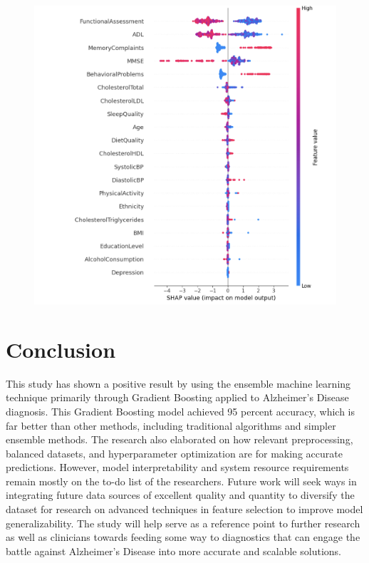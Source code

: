 \documentclass[conference]{IEEEtran} %
\begin{document}
\begin{figure}[ht]
    \centering
    \includegraphics[width=\linewidth]{Fig-10.png}
    \caption{}
    \label{fig:10}
\end{figure}
\FloatBarrier



\section{Conclusion}

This study has shown a positive result by using the ensemble machine learning technique primarily through Gradient Boosting applied to Alzheimer's Disease diagnosis. This Gradient Boosting model achieved 95 percent accuracy, which is far better than other methods, including traditional algorithms and simpler ensemble methods. The research also elaborated on how relevant preprocessing, balanced datasets, and hyperparameter optimization are for making accurate predictions. However, model interpretability and system resource requirements remain mostly on the to-do list of the researchers. Future work will seek ways in integrating future data sources of excellent quality and quantity to diversify the dataset for research on advanced techniques in feature selection to improve model generalizability. The study will help serve as a reference point to further research as well as clinicians towards feeding some way to diagnostics that can engage the battle against Alzheimer's Disease into more accurate and scalable solutions.
\end{document}
